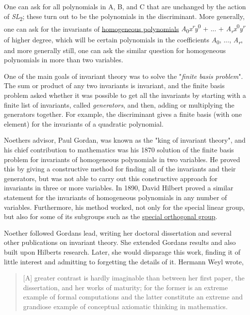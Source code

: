 One can ask for all polynomials in {A}, {B}, and {C} that are unchanged by the action of {\emph{SL}\textsubscript{2}}; these turn out to be the polynomials in the discriminant. More generally, one can ask for the invariants of \href{https://en.wikipedia.org/wiki/Homogeneous_polynomial}{homogeneous polynomials} {\emph{A}\textsubscript{0}\emph{x}\textsuperscript{\emph{r}}\emph{y}\textsuperscript{0} + ... + \emph{A\textsubscript{r}x}\textsuperscript{0}\emph{y}\textsuperscript{\emph{r}}} of higher degree, which will be certain polynomials in the coefficients {\emph{A}\textsubscript{0}, ..., \emph{A\textsubscript{r}}}, and more generally still, one can ask the similar question for homogeneous polynomials in more than two variables.

One of the main goals of invariant theory was to solve the "\emph{finite basis problem}". The sum or product of any two invariants is invariant, and the finite basis problem asked whether it was possible to get all the invariants by starting with a finite list of invariants, called \emph{generators}, and then, adding or multiplying the generators together. For example, the discriminant gives a finite basis (with one element) for the invariants of a quadratic polynomial.

Noether\textquotesingle s advisor, Paul Gordan, was known as the "king of invariant theory", and his chief contribution to mathematics was his 1870 solution of the finite basis problem for invariants of homogeneous polynomials in two variables. He proved this by giving a constructive method for finding all of the invariants and their generators, but was not able to carry out this constructive approach for invariants in three or more variables. In 1890, David Hilbert proved a similar statement for the invariants of homogeneous polynomials in any number of variables. Furthermore, his method worked, not only for the special linear group, but also for some of its subgroups such as the \href{https://en.wikipedia.org/wiki/Special_orthogonal_group}{special orthogonal group}.

Noether followed Gordan\textquotesingle s lead, writing her doctoral dissertation and several other publications on invariant theory. She extended Gordan\textquotesingle s results and also built upon Hilbert\textquotesingle s research. Later, she would disparage this work, finding it of little interest and admitting to forgetting the details of it. Hermann Weyl wrote,

\begin{quote}
{[}A{]} greater contrast is hardly imaginable than between her first paper, the dissertation, and her works of maturity; for the former is an extreme example of formal computations and the latter constitute an extreme and grandiose example of conceptual axiomatic thinking in mathematics.
\end{quote}


